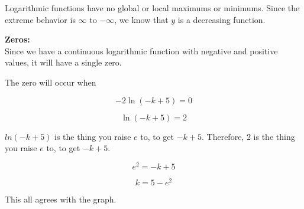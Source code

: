 \documentclass{ximera}
\begin{document}
\begin{exercise}
Logarithmic functions have no global or local maximums or minimums. Since the extreme behavior is $\infty$ to $-\infty$, we know that $y$ is a decreasing function.




\textbf{\textcolor{blue!55!black}{Zeros:}}  \\


Since we have a continuous logarithmic function with negative and positive values, it will have a single zero.


The zero will occur when 

\[
-2 \ln(-k+5) = 0
\]

\[
\ln(-k+5) = 2
\]



$ln(-k+5)$ is the thing you raise $e$ to, to get $-k+5$. Therefore, $2$ is the thing you raise $e$ to, to get $-k+5$. 

\[
e^2 = -k + 5
\]


\[
k = 5 - e^2 
\]



This all agrees with the graph.


\begin{image}
\end{image}















\end{exercise}
\end{document}
